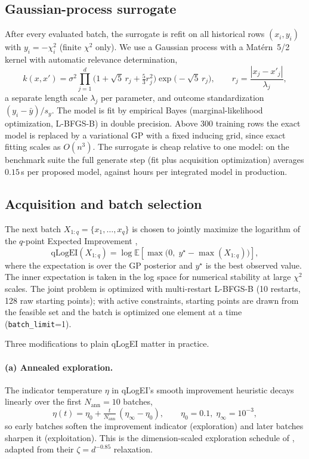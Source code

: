 \subsection{Gaussian-process surrogate}
\label{app:bayesopt:gp}
After every evaluated batch, the surrogate is refit on all historical
rows $(x_i, y_i)$ with $y_i = -\chi^2_i$ (finite $\chi^2$ only). We use
a Gaussian process with a Mat\'ern~5/2 kernel with automatic relevance
determination,
\begin{equation}
  k(x, x') = \sigma^2 \prod_{j=1}^{d} \bigl(1 + \sqrt{5}\, r_j +
  \tfrac{5}{3} r_j^2\bigr) \exp\bigl(-\sqrt{5}\, r_j\bigr),
  \qquad r_j = \frac{|x_j - x'_j|}{\lambda_j},
\end{equation}
a separate length scale $\lambda_j$ per parameter, and outcome
standardization $(y_i - \bar y)/s_y$. The model is fit by empirical
Bayes (marginal-likelihood optimization, L-BFGS-B) in double precision.
Above 300 training rows the exact model is replaced by a variational GP
with a fixed inducing grid, since exact fitting scales as $O(n^3)$. The
surrogate is cheap relative to one model: on the benchmark suite the
full generate step (fit plus acquisition optimization) averages
$0.15\,$s per proposed model, against hours per integrated model in
production.

\subsection{Acquisition and batch selection}
\label{app:bayesopt:acq}
The next batch $X_{1:q} = \{x_1, \dots, x_q\}$ is chosen to jointly
maximize the logarithm of the $q$-point Expected Improvement
\citep[qLogEI;][]{eriksson2019turbo},
\begin{equation}
  \mathrm{qLogEI}(X_{1:q}) =
  \log \mathbb{E}\!\left[\max\bigl(0,\; y^\star -
  \max(X_{1:q})\bigr)\right],
\end{equation}
where the expectation is over the GP posterior and $y^\star$ is the best
observed value. The inner expectation is taken in the log space for
numerical stability at large $\chi^2$ scales. The joint problem is
optimized with multi-restart L-BFGS-B (10 restarts, 128 raw starting
points); with active constraints, starting points are drawn from the
feasible set and the batch is optimized one element at a time
(\texttt{batch\_limit}=1).

Three modifications to plain qLogEI matter in practice.

\paragraph{(a) Annealed exploration.} The indicator temperature $\eta$
in qLogEI's smooth improvement heuristic decays linearly over the first
$N_\mathrm{ann}=10$ batches,
\begin{equation}
  \eta(t) = \eta_0 + \tfrac{t}{N_\mathrm{ann}}\,(\eta_\infty - \eta_0),
  \qquad \eta_0 = 0.1,\; \eta_\infty = 10^{-3},
\end{equation}
so early batches soften the improvement indicator (exploration) and
later batches sharpen it (exploitation). This is the dimension-scaled
exploration schedule of \citet{elgammal2023gpry}, adapted from their
$\zeta = d^{-0.85}$ relaxation.

